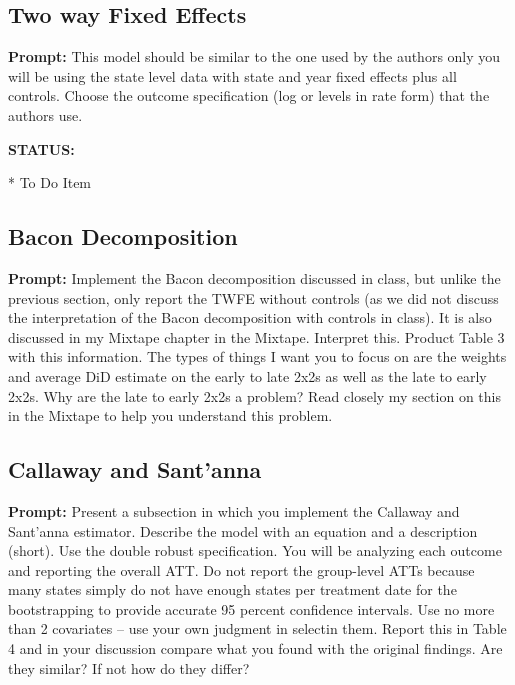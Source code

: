 \documentclass{article}
\begin{document}
	\subsection{Two way Fixed Effects}
	
	\textbf{Prompt: } This model should be similar to the one used by the authors only you will be using the state level data with state and year fixed effects plus all controls.  Choose the outcome specification (log or levels in rate form) that the authors use.
	
	\textbf{STATUS:}
	
	* To Do Item
	
	
	
	
	
	
	
	
	\subsection{Bacon Decomposition}
	
	\textbf{Prompt: } Implement the Bacon decomposition discussed in class, but unlike the previous section, only report the TWFE without controls (as we did not discuss the interpretation of the Bacon decomposition with controls in class).  It is also discussed in my Mixtape chapter in the Mixtape.  Interpret this.  Product Table 3 with this information.  The types of things I want you to focus on are the weights and average DiD estimate on the early to late 2x2s as well as the late to early 2x2s. Why are the late to early 2x2s a problem?  Read closely my section on this in the Mixtape to help you understand this problem.  
	
	\begin{landscape}
	
	
	
	
	
	
	\end{landscape}
	
	
	\subsection{Callaway and Sant'anna}
	
	\textbf{Prompt: } Present a subsection in which you implement the Callaway and Sant’anna estimator.  Describe the model with an equation and a description (short). Use the double robust specification. You will be analyzing each outcome and reporting the overall ATT.  Do not report the group-level ATTs because many states simply do not have enough states per treatment date for the bootstrapping to provide accurate 95 percent confidence intervals.  Use no more than 2 covariates – use your own judgment in selectin them. Report this in Table 4 and in your discussion compare what you found with the original findings.  Are they similar?  If not how do they differ?
	
\end{document}
